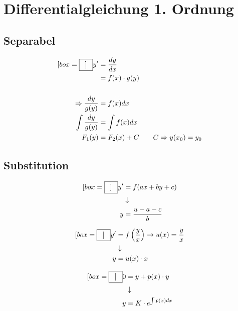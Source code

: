 \documentclass[a4paper]{fhnwreport} %
\newcommand*{\widebox}[2][0.5em]{\fbox{\hspace{#1}$\displaystyle #2$\hspace{#1}}}
\begin{document}
%
%

\section{Differentialgleichung 1. Ordnung}
\subsection{Separabel}
\begin{align*}[box=\widebox]
y' &= \frac{d y}{d x} \\
&= f(x)\cdot g(y)\\\\
\Rightarrow \frac{d y}{g(y)} &= f(x)d x\\
\int{\frac{d y}{g(y)}} &= \int{f(x)d x}\\
F_{1}(y) &= F_{2}(x)+C \qquad C\Rightarrow y(x_{0}) = y_{0}
\end{align*}

\subsection{Substitution}

\begin{center}
\begin{align*}[box=\widebox]
y' &= f(ax+by+c) \\
&\downarrow \\
y &= \frac{u-a-c}{b}
\end{align*}
\end{center}

\begin{center}
\begin{align*}[box=\widebox]
y' &= f\left(\frac{y}{x}\right) \rightarrow u(x)=\frac{y}{x}\\
&\downarrow \\
y &= u(x)\cdot x
\end{align*}
\end{center}

\begin{center}
\begin{align*}[box=\widebox]
0 &= y + p(x)\cdot y \\
&\downarrow \\
y &= K\cdot e^{\int p(x)dx}
\end{align*}
\end{center}
\end{document}

